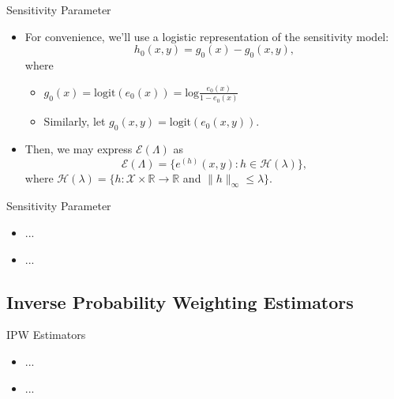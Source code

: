 \documentclass{beamer}
\newcommand{\R}{\mathbb{R}}
\begin{document}
\begin{frame}{Sensitivity Parameter}

\begin{itemize}
  \itemsep12pt
  \item For convenience, we'll use a logistic representation of the sensitivity
    model:
    \[ h_0(x,y) = g_0(x) - g_0(x,y),\]
    where
    \begin{itemize}
      \itemsep6pt
      \item $g_0(x)=\text{logit}(e_0(x))=\text{log}\frac{e_0(x)}{1-e_0(x)}$
      \item Similarly, let $g_0(x,y) = \text{logit}(e_0(x,y))$.
    \end{itemize}
  \item Then, we may express $\mathcal{E}(\Lambda)$ as
    \[\mathcal{E}(\Lambda) = \{e^{(h)}(x,y): h \in \mathcal{H}(\lambda)\},\]
    where $\mathcal{H}(\lambda) = \{h: \mathcal{X} \times \R \to \R$ and
    $\lVert h \rVert_{\infty} \leq \lambda\}$.
\end{itemize}

\end{frame}


\begin{frame}{Sensitivity Parameter}

\begin{itemize}
  \itemsep12pt
  \item ...
  \item ...
\end{itemize}

\end{frame}

\subsection{Inverse Probability Weighting Estimators}

\begin{frame}{IPW Estimators}

\begin{itemize}
  \itemsep12pt
  \item ...
  \item ...
\end{itemize}

\end{frame}
\end{document}
